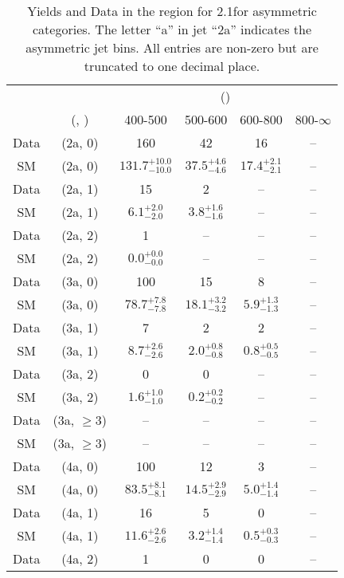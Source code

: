 \begin{table}[h!]
\tiny
\centering
\caption{Yields and Data in the \gj region for 2.1\ifb for asymmetric categories. The letter ``a'' in jet \eg ``2a''  indicates the asymmetric jet bins. All entries are non-zero but are truncated to one decimal place.\label{tab:yieldsallqcd_gj_comb_asym}}
\begin{tabular}
{cccccc}
	\hline\hline
	&	& \multicolumn{4}{c}{\scalht (\gev)}\\ 
	&	 (\njet, \nb) & 400-500 & 500-600 & 600-800 & 800-$\infty$ \\ [0.8ex] 
\hline
	Data & (2a, 0) & 160 & 42 & 16 & -- \\[0.5ex] 
	SM & (2a, 0) & $131.7^{+ 10.0 }_{- 10.0 }$ & $37.5^{+ 4.6 }_{- 4.6 }$ & $17.4^{+ 2.1 }_{- 2.1 }$ & -- \\[0.5ex] 
	Data & (2a, 1) & 15 & 2 & -- & -- \\[0.5ex] 
	SM & (2a, 1) & $6.1^{+ 2.0 }_{- 2.0 }$ & $3.8^{+ 1.6 }_{- 1.6 }$ & -- & -- \\[0.5ex] 
	Data & (2a, 2) & 1 & -- & -- & -- \\[0.5ex] 
	SM & (2a, 2) & $0.0^{+ 0.0 }_{- 0.0 }$ & -- & -- & -- \\[0.5ex] 
	Data & (3a, 0) & 100 & 15 & 8 & -- \\[0.5ex] 
	SM & (3a, 0) & $78.7^{+ 7.8 }_{- 7.8 }$ & $18.1^{+ 3.2 }_{- 3.2 }$ & $5.9^{+ 1.3 }_{- 1.3 }$ & -- \\[0.5ex] 
	Data & (3a, 1) & 7 & 2 & 2 & -- \\[0.5ex] 
	SM & (3a, 1) & $8.7^{+ 2.6 }_{- 2.6 }$ & $2.0^{+ 0.8 }_{- 0.8 }$ & $0.8^{+ 0.5 }_{- 0.5 }$ & -- \\[0.5ex] 
	Data & (3a, 2) & 0 & 0 & -- & -- \\[0.5ex] 
	SM & (3a, 2) & $1.6^{+ 1.0 }_{- 1.0 }$ & $0.2^{+ 0.2 }_{- 0.2 }$ & -- & -- \\[0.5ex] 
	Data & (3a, $\ge3$) & -- & -- & -- & -- \\[0.5ex] 
	SM & (3a, $\ge3$) & -- & -- & -- & -- \\[0.5ex] 
	Data & (4a, 0) & 100 & 12 & 3 & -- \\[0.5ex] 
	SM & (4a, 0) & $83.5^{+ 8.1 }_{- 8.1 }$ & $14.5^{+ 2.9 }_{- 2.9 }$ & $5.0^{+ 1.4 }_{- 1.4 }$ & -- \\[0.5ex] 
	Data & (4a, 1) & 16 & 5 & 0 & -- \\[0.5ex] 
	SM & (4a, 1) & $11.6^{+ 2.6 }_{- 2.6 }$ & $3.2^{+ 1.4 }_{- 1.4 }$ & $0.5^{+ 0.3 }_{- 0.3 }$ & -- \\[0.5ex] 
	Data & (4a, 2) & 1 & 0 & 0 & -- \\[0.5ex] 

\end{tabular}
\end{table}
